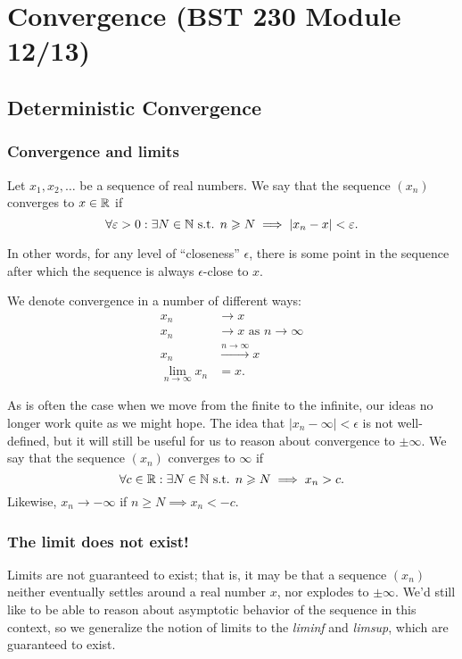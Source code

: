 \section{Convergence (BST 230 Module 12/13)}

\subsection{Deterministic Convergence}

\subsubsection{Convergence and limits}
Let $x_1, x_2, \hdots$ be a sequence of real numbers. We say that the sequence $(x_n)$
converges to $x \in \mathbb R$ if 
\[
    \forall \varepsilon > 0:
    \exists N \in \mathbb N \text{ s.t. }
    n \geqslant N \implies |x_n - x| < \varepsilon. 
\]

In other words, for any level of ``closeness'' $\epsilon$, there is some point in the 
sequence after which the sequence is always $\epsilon$-close to $x$.

We denote convergence in a number of different ways:
\begin{align*}
    x_n &\rightarrow x \\
    x_n &\rightarrow x \text{ as } n \rightarrow \infty \\
    x_n &\stackrel{n \rightarrow \infty}{ \rightarrow } x \\
    \lim_{n \rightarrow \infty} x_n &= x.
\end{align*}

As is often the case when we move from the finite to the infinite,
our ideas no longer work quite as we might hope. 
The idea that $|x_n - \infty| < \epsilon$
is not well-defined, but it will still be useful for us to reason about 
convergence to $\pm \infty$. We say that the sequence $(x_n)$ converges to $\infty$ 
if 
\[
    \forall c \in \mathbb R:
    \exists N \in \mathbb N \text{ s.t. }
    n \geqslant N \implies x_n > c.
\]
Likewise, $x_n \rightarrow -\infty$ if $n \geq N \implies x_n < -c$.

\subsubsection{The limit does not exist!}

Limits are not guaranteed to exist; that is, it may be that a sequence $(x_n)$ 
neither eventually settles around a real number $x$, nor explodes to $\pm \infty$.
We'd still like to be able to reason about asymptotic behavior of the sequence 
in this context, so we generalize the notion of limits to the \emph{liminf}
and \emph{limsup}, which are guaranteed to exist.

